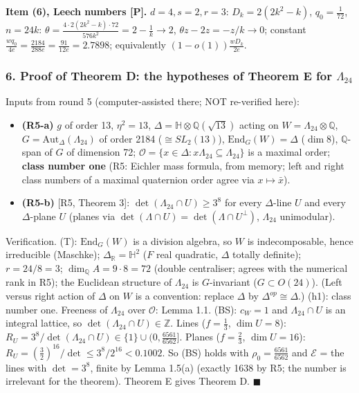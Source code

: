 \textbf{Item (6), Leech numbers {[}P{]}.} \(d=4,s=2,r=3\): \(D_k=2(2k^2-k)\), \(q_0=\frac1{72}\), \(n=24k\): \(\theta=\frac{4\cdot2(2k^2-k)\cdot72}{576k^2}=2-\frac1k\to2\), \(\theta z-2z=-z/k\to0\); constant \(\frac{wq_0}{4e}=\frac{2184}{288e}=\frac{91}{12e}=2.7898\); equivalently \((1-o(1))\frac{wD_k}{2e}\).

\hypertarget{proof-of-theorem-d-the-hypotheses-of-theorem-e-for-lambda_24}{%
\subsubsection*{\texorpdfstring{6. Proof of Theorem D: the hypotheses of Theorem E for \(\Lambda_{24}\)}{6. Proof of Theorem D: the hypotheses of Theorem E for \textbackslash Lambda\_\{24\}}}\label{proof-of-theorem-d-the-hypotheses-of-theorem-e-for-lambda_24}}

Inputs from round 5 (computer-assisted there; NOT re-verified here):

\begin{itemize}
\tightlist
\item
  \textbf{(R5-a)} \(g\) of order 13, \(\eta^2=13\), \(\Delta=\mathbb H\otimes\mathbb Q(\sqrt{13})\) acting on \(W=\Lambda_{24}\otimes\mathbb Q\), \(G=\mathrm{Aut}_\Delta(\Lambda_{24})\) of order 2184 (\(\cong SL_2(13)\)), \(\mathrm{End}_G(W)=\Delta\) (\(\dim8\)), \(\mathbb Q\)-span of \(G\) of dimension 72; \(\mathcal O=\{x\in\Delta:x\Lambda_{24}\subseteq\Lambda_{24}\}\) is a maximal order; \textbf{class number one} (R5: Eichler mass formula, from memory; left and right class numbers of a maximal quaternion order agree via \(x\mapsto\bar x\)).
\item
  \textbf{(R5-b)} {[}R5, Theorem 3{]}: \(\det(\Lambda_{24}\cap U)\ge3^8\) for every \(\Delta\)-line \(U\) and every \(\Delta\)-plane \(U\) (planes via \(\det(\Lambda\cap U)=\det(\Lambda\cap U^\perp)\), \(\Lambda_{24}\) unimodular).
\end{itemize}

Verification. (T): \(\mathrm{End}_G(W)\) is a division algebra, so \(W\) is indecomposable, hence irreducible (Maschke); \(\Delta_{\mathbb R}=\mathbb H^2\) (\(F\) real quadratic, \(\Delta\) totally definite); \(r=24/8=3\); \(\dim_{\mathbb Q}A=9\cdot8=72\) (double centraliser; agrees with the numerical rank in R5); the Euclidean structure of \(\Lambda_{24}\) is \(G\)-invariant (\(G\subset O(24)\)). (Left versus right action of \(\Delta\) on \(W\) is a convention: replace \(\Delta\) by \(\Delta^{op}\cong\Delta\).) (h1): class number one. Freeness of \(\Lambda_{24}\) over \(\mathcal O\): Lemma 1.1. (BS): \(c_W=1\) and \(\Lambda_{24}\cap U\) is an integral lattice, so \(\det(\Lambda_{24}\cap U)\in\mathbb Z\). Lines (\(f=\frac13\), \(\dim U=8\)): \(R_U=3^8/\det(\Lambda_{24}\cap U)\in\{1\}\cup(0,\frac{6561}{6562}]\). Planes (\(f=\frac23\), \(\dim U=16\)): \(R_U=(\frac32)^{16}/\det\le3^8/2^{16}<0.1002\). So (BS) holds with \(\rho_0=\frac{6561}{6562}\) and \(\mathcal E\) = the lines with \(\det=3^8\), finite by Lemma 1.5(a) (exactly 1638 by R5; the number is irrelevant for the theorem). Theorem E gives Theorem D. \(\blacksquare\)

